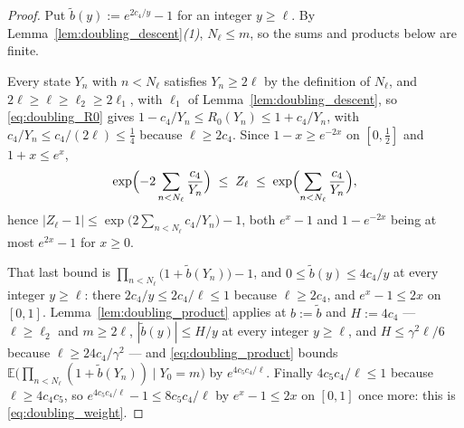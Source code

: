 \begin{proof}
Put $\widetilde b(y):=e^{2c_4/y}-1$ for an integer $y\geq\ell$. By
Lemma~\ref{lem:doubling_descent}\emph{(1)}, $N_\ell\leq m$, so the sums and products below are
finite.

Every state $Y_n$ with $n<N_\ell$ satisfies $Y_n\geq2\ell$ by the definition of $N_\ell$, and
$2\ell\geq\ell\geq\ell_2\geq2\ell_1$, with $\ell_1$ of Lemma~\ref{lem:doubling_descent}, so
\eqref{eq:doubling_R0} gives $1-c_4/Y_n\leq R_0(Y_n)\leq1+c_4/Y_n$, with
$c_4/Y_n\leq c_4/(2\ell)\leq\tfrac14$ because
$\ell\geq2c_4$. Since $1-x\geq e^{-2x}$ on $[0,\tfrac12]$ and $1+x\leq e^{x}$,
\begin{equation}
    \exp\Bigl(-2\sum_{n<N_\ell}\frac{c_4}{Y_n}\Bigr)\;\leq\;Z_\ell\;\leq\;
    \exp\Bigl(\sum_{n<N_\ell}\frac{c_4}{Y_n}\Bigr),
\end{equation}
hence $|Z_\ell-1|\leq\exp\bigl(2\sum_{n<N_\ell}c_4/Y_n\bigr)-1$, both $e^{x}-1$ and $1-e^{-2x}$
being at most $e^{2x}-1$ for $x\geq0$.

That last bound is $\prod_{n<N_\ell}\bigl(1+\widetilde b(Y_n)\bigr)-1$, and
$0\leq\widetilde b(y)\leq4c_4/y$ at every integer $y\geq\ell$: there $2c_4/y\leq2c_4/\ell\leq1$
because $\ell\geq2c_4$, and $e^{x}-1\leq2x$ on $[0,1]$. Lemma~\ref{lem:doubling_product}
applies at $b:=\widetilde b$ and $H:=4c_4$ --- $\ell\geq\ell_2$ and $m\geq2\ell$,
$|\widetilde b(y)|\leq H/y$ at every integer $y\geq\ell$, and $H\leq\gamma^2\ell/6$ because
$\ell\geq24c_4/\gamma^2$ --- and \eqref{eq:doubling_product} bounds
$\mathbb E\bigl(\prod_{n<N_\ell}(1+\widetilde b(Y_n))\mid Y_0=m\bigr)$ by $e^{4c_5c_4/\ell}$.
Finally $4c_5c_4/\ell\leq1$ because $\ell\geq4c_4c_5$, so $e^{4c_5c_4/\ell}-1\leq8c_5c_4/\ell$
by $e^{x}-1\leq2x$ on $[0,1]$ once more: this is \eqref{eq:doubling_weight}.
\end{proof}

